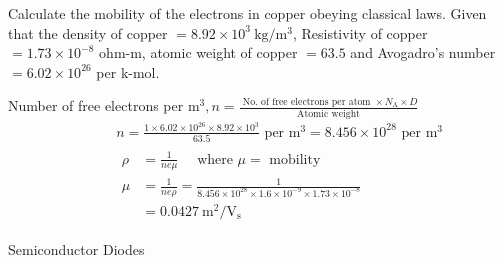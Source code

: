 \begin{exercise}
	Calculate the mobility of the electrons in copper obeying classical laws. Given that the density of copper $=8.92 \times 10^{3} \mathrm{~kg} / \mathrm{m}^{3}$, Resistivity of copper $=1.73 \times 10^{-8}$ ohm-m, atomic weight of copper $=63.5$ and Avogadro's number $=6.02 \times 10^{26}$ per k-mol.
\end{exercise}
\begin{answer}
	Number of free electrons per $\mathrm{m}^{3}, n=\frac{\text { No. of free electrons per atom } \times N_{\mathrm{A}} \times D}{\text { Atomic weight }}$
	$$
	\begin{aligned}
	&\qquad n=\frac{1 \times 6.02 \times 10^{26} \times 8.92 \times 10^{3}}{63.5} \text { per } \mathrm{m}^{3}=8.456 \times 10^{28} \text { per } \mathrm{m}^{3} \\
	&\qquad \begin{aligned}
	\rho &=\frac{1}{n e \mu} \quad \text { where } \mu=\text { mobility } \\
	\mu &=\frac{1}{n e \rho}=\frac{1}{8.456 \times 10^{28} \times 1.6 \times 10^{-9} \times 1.73 \times 10^{-8}} \\
	&=0.0427 \mathrm{~m}^{2} / \mathrm{V}_{\mathrm{s}}
	\end{aligned}
	\end{aligned}
	$$
\end{answer}
\newpage
\begin{abox}
	Semiconductor Diodes
\end{abox}
